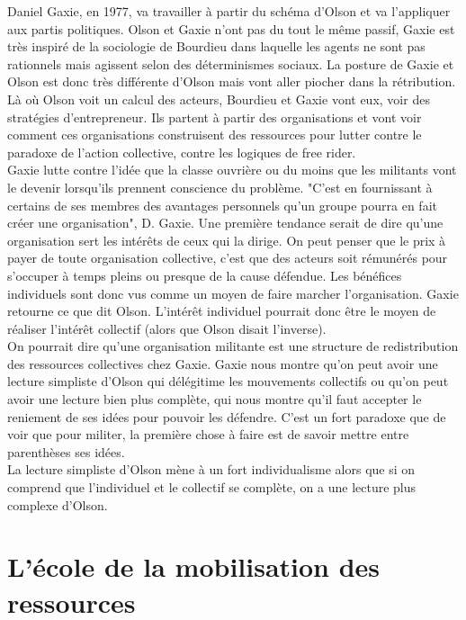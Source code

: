 \documentclass[10pt, a4paper, openany]{book}
\begin{document}
Daniel Gaxie, en 1977, va travailler à partir du schéma d'Olson et va l'appliquer aux partis politiques. Olson et Gaxie n'ont pas du tout le même passif, Gaxie est très inspiré de la sociologie de Bourdieu dans laquelle les agents ne sont pas rationnels mais agissent selon des déterminismes sociaux. La posture de Gaxie et Olson est donc très différente d'Olson mais vont aller piocher dans la rétribution. \\
Là où Olson voit un calcul des acteurs, Bourdieu et Gaxie vont eux, voir des stratégies d'entrepreneur. Ils partent à partir des organisations et vont voir comment ces organisations construisent des ressources pour lutter contre le paradoxe de l'action collective, contre les logiques de free rider. \\
Gaxie lutte contre l'idée que la classe ouvrière ou du moins que les militants vont le devenir lorsqu'ils prennent conscience du problème. "C'est en fournissant à certains de ses membres des avantages personnels qu'un groupe pourra en fait créer une organisation", D. Gaxie. Une première tendance serait de dire qu'une organisation sert les intérêts de ceux qui la dirige. On peut penser que le prix à payer de toute organisation collective, c'est que des acteurs soit rémunérés pour s'occuper à temps pleins ou presque de la cause défendue. Les bénéfices individuels sont donc vus comme un moyen de faire marcher l'organisation. Gaxie retourne ce que dit Olson. L'intérêt individuel pourrait donc être le moyen de réaliser l'intérêt collectif (alors que Olson disait l'inverse). \\
On pourrait dire qu'une organisation militante est une structure de redistribution des ressources collectives chez Gaxie. Gaxie nous montre qu'on peut avoir une lecture simpliste d'Olson qui délégitime les mouvements collectifs ou qu'on peut avoir une lecture bien plus complète, qui nous montre qu'il faut accepter le reniement de ses idées pour pouvoir les défendre. C'est un fort paradoxe que de voir que pour militer, la première chose à faire est de savoir mettre entre parenthèses ses idées. \\
La lecture simpliste d'Olson mène à un fort individualisme alors que si on comprend que l'individuel et le collectif se complète, on a une lecture plus complexe d'Olson. 

\chapter{L'école de la mobilisation des ressources}
\end{document}
